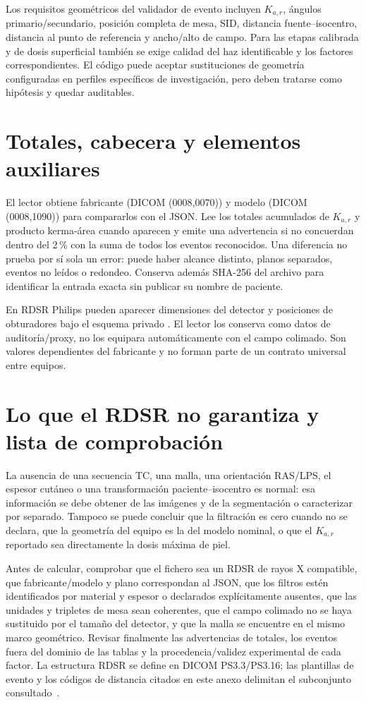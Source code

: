 Los requisitos geométricos del validador de evento incluyen $K_{a,r}$, ángulos primario/secundario, posición completa de mesa, SID, distancia fuente--isocentro, distancia al punto de referencia y ancho/alto de campo. Para las etapas calibrada y de dosis superficial también se exige calidad del haz identificable y los factores correspondientes. El código puede aceptar sustituciones de geometría configuradas en perfiles específicos de investigación, pero deben tratarse como hipótesis y quedar auditables.

\section{Totales, cabecera y elementos auxiliares}
El lector obtiene fabricante (DICOM (0008,0070)) y modelo (DICOM (0008,1090)) para compararlos con el JSON. Lee los totales acumulados de $K_{a,r}$ y producto kerma-área cuando aparecen y emite una advertencia si no concuerdan dentro del 2\,\% con la suma de todos los eventos reconocidos. Una diferencia no prueba por sí sola un error: puede haber alcance distinto, planos separados, eventos no leídos o redondeo. Conserva además SHA-256 del archivo para identificar la entrada exacta sin publicar su nombre de paciente.

En RDSR Philips pueden aparecer dimensiones del detector y posiciones de obturadores bajo el esquema privado . El lector los conserva como datos de auditoría/proxy, no los equipara automáticamente con el campo colimado. Son valores dependientes del fabricante y no forman parte de un contrato universal entre equipos.

\section{Lo que el RDSR no garantiza y lista de comprobación}
La ausencia de una secuencia TC, una malla, una orientación RAS/LPS, el espesor cutáneo o una transformación paciente--isocentro es normal: esa información se debe obtener de las imágenes y de la segmentación o caracterizar por separado. Tampoco se puede concluir que la filtración es cero cuando no se declara, que la geometría del equipo es la del modelo nominal, o que el $K_{a,r}$ reportado sea directamente la dosis máxima de piel.

Antes de calcular, comprobar que el fichero sea un RDSR de rayos X compatible, que fabricante/modelo y plano correspondan al JSON, que los filtros estén identificados por material y espesor o declarados explícitamente ausentes, que las unidades y tripletes de mesa sean coherentes, que el campo colimado no se haya sustituido por el tamaño del detector, y que la malla se encuentre en el mismo marco geométrico. Revisar finalmente las advertencias de totales, los eventos fuera del dominio de las tablas y la procedencia/validez experimental de cada factor. La estructura RDSR se define en DICOM PS3.3/PS3.16; las plantillas de evento y los códigos de distancia citados en este anexo delimitan el subconjunto consultado~\citep{dicom}.
